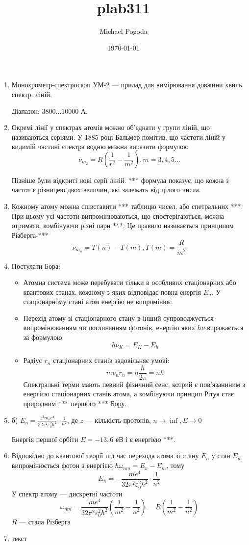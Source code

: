 \documentclass[a4paper,10pt,notitlepage,pdftex,headsepline]{scrartcl}
\author{Michael Pogoda}
\title{plab311}
\date{\today}
\begin{document}
\begin{enumerate}
\item Монохрометр-спектроскоп УМ-2 --- прилад для вимірювання довжини хвиль спектр. ліній.

Діапазон: $3800\dots10000$ А.
\item Окремі лінії у спектрах атомів можно об’єднати у групи ліній, що називаються серіями.
У 1885 році Бальмер помітив, що частоти ліній у видимій частині спектра водню можна виразити формулою
$$\nu_{m_2} = R\left(\frac{1}{r^2} - \frac{1}{m^2}\right), m = 3,4,5\dots$$

Пізніше були відкриті нові серії ліній.
*** формула показує, що кожна з частот є різницею двох величин, які залежать від цілого числа.
\item Кожному атому можна співставити *** таблицю чисел, або спетральних ***.
При цьому усі частоти випромінюваються, що спостерігаються, можна отримати, комбінуючи різні пари ***.
Це правило називається принципом Різберга-***
$$\nu_{m_n} = T\left(n\right) - T\left(m\right), T\left(m\right) = \frac{R}{m^2}$$
\item Постулати Бора:
\begin{itemize}
\item Атомна система може перебувати тільки в особливих стаціонарних або квантових станах, кожному з яких відповідає повна енергія $E_n$.
У стаціонарному стані атом енергію не випромінює.
\item Перехід атому зі стаціонарного стану в інший супроводжується випромінюванням чи поглинанням фотонів, енергію яких $h\nu$ виражається за формулою
$$ h\nu_K = E_K - E_h$$
\item Радіус $r_n$ стаціонарних станів задовільняє умові:
$$m v_n r_n = n\frac{h}{2\pi} = n\hbar$$
Спектральні терми мають певний фізичний сенс, котрий є пов’язаниним з енергією стаціонарних станів атома, а комбінуючи принцип Рітуя стає природним *** першого *** Бору.
\end{itemize}
\item б) $E_n = \frac{z^2 m_e e^4}{32\pi^2\varepsilon_0^2 \hbar^2} \cdot \frac{1}{n^2}$, де $z$ --- кількість протонів, $n\to\inf, E\to 0$

Енергія першої орбіти $E = -13,6$ еВ і є енергією ***.
\item Відповідно до квантової теорії під час перехода атома зі стану $E_n$ у стан $E_m$ випромінюється фотон з енергією $\hbar \omega_{nm} = E_n-E_m$, тому
$$E_n = - \frac{me^4}{32\pi^2\varepsilon_0^2\hbar^2} \cdot \frac{1}{n^2}$$
У спектр атому --- дискретні частоти
$$\omega_{nm} = \frac{me^4}{32\pi^2\varepsilon_0^2\hbar^2} \left(\frac{1}{m^2} - \frac{1}{n^2}\right) = R\left(\frac{1}{m^2} - \frac{1}{n^2}\right)$$
$R$ --- стала Різберга
\item текст


\end{enumerate}
\end{document}
